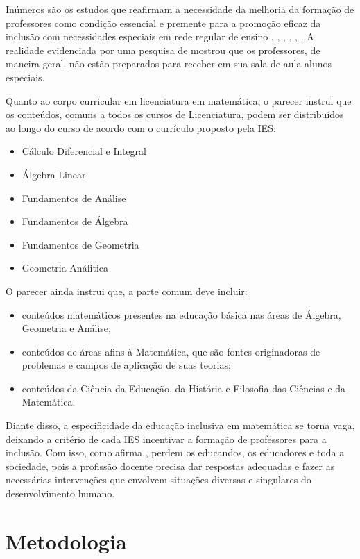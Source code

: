 \documentclass[12pt]{article}
\begin{document}
\noindent
Inúmeros são os estudos que reafirmam a necessidade da melhoria da formação de professores como condição essencial e premente para a promoção eficaz da inclusão com necessidades especiais em rede regular de ensino \cite{pletsch2009formaccao}, \cite{bueno1999crianccas}, \cite{antunes2011formaccao}, \cite{antuneseducaccao}, \cite{glat2004papel}, \cite{magalhaes1999viver}. A realidade evidenciada por uma pesquisa de \cite{ferreira20031} mostrou que os professores, de maneira geral, não estão preparados para receber em sua sala de aula alunos especiais. 

\noindent
Quanto ao corpo curricular em licenciatura em matemática, o parecer \cite{diretrizesmatematica2001} instrui que os conteúdos, comuns a todos os cursos de Licenciatura, podem ser distribuídos ao longo do curso de acordo com o currículo proposto pela IES:
\begin{itemize}
    \item Cálculo Diferencial e Integral
    \item Álgebra Linear
    \item Fundamentos de Análise
    \item Fundamentos de Álgebra
    \item Fundamentos de Geometria
    \item Geometria Análitica
\end{itemize}
\noindent
O parecer ainda instrui que, a parte comum deve incluir:
\begin{itemize}
    \item conteúdos matemáticos presentes na educação básica nas áreas de Álgebra, Geometria e Análise;
    \item conteúdos de áreas afins à Matemática, que são fontes originadoras de problemas e campos de aplicação de suas teorias;
    \item conteúdos da Ciência da Educação, da História e Filosofia das Ciências e da Matemática.
\end{itemize}

\noindent
Diante disso, a especificidade da educação inclusiva em matemática se torna vaga, deixando a critério de cada IES incentivar a formação de professores para a inclusão. Com isso, como afirma \cite{pletsch2009formaccao}, perdem os educandos, os educadores e toda a sociedade, pois a profissão docente precisa dar respostas adequadas e fazer as necessárias intervenções que envolvem situações diversas e singulares do desenvolvimento humano.

\section{Metodologia}
\end{document}
